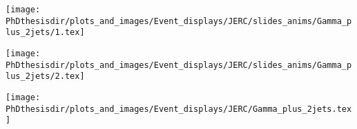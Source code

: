 \begin{frame}
\begin{center}
\texttt{[image: \\PhDthesisdir/plots\_and\_images/Event\_displays/JERC/slides\_anims/Gamma\_plus\_2jets/1.tex]}
\end{center}
\end{frame}

\begin{frame}
\addtocounter{framenumber}{-1}
\transboxout
{}
\begin{center}
\texttt{[image: \\PhDthesisdir/plots\_and\_images/Event\_displays/JERC/slides\_anims/Gamma\_plus\_2jets/2.tex]}
\end{center}
\end{frame}

\begin{frame}
\addtocounter{framenumber}{-1}
\transdissolve
\begin{center}
\texttt{[image: \\PhDthesisdir/plots\_and\_images/Event\_displays/JERC/Gamma\_plus\_2jets.tex]}
\end{center}
\end{frame}